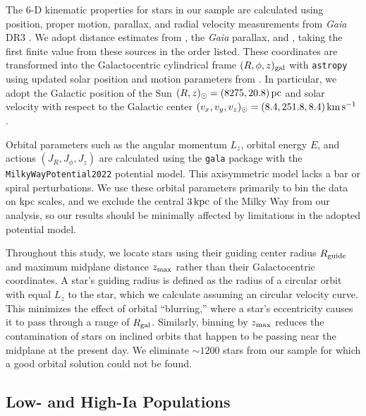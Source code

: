 \documentclass[twocolumn,twocolappendix]{aastex701}
\newcommand{\pc}{\,{\rm pc}}
\newcommand{\kpc}{\,{\rm kpc}}
\newcommand{\kms}{\,{\rm km}\,{\rm s}^{-1}}
\begin{document}
The 6-D kinematic properties for stars in our sample are calculated using position, proper motion, parallax, and radial velocity measurements from {\it Gaia} DR3 \citep{gaia_collaboration_gaia_2023}. We adopt distance estimates from \citet{zhang_parameters_2023}, the {\it Gaia} parallax, and \citet{bailer-jones_estimating_2021}, taking the first finite value from these sources in the order listed. These coordinates are transformed into the Galactocentric cylindrical frame $(R,\phi,z)_{\rm gal}$ with {\tt astropy} \citep{astropy_collaboration_astropy_2013,astropy_collaboration_astropy_2018,astropy_collaboration_astropy_2022} using updated solar position and motion parameters from \citet{hunt_multiple_2022}. In particular, we adopt the Galactic position of the Sun $(R,z)_\odot=(8275,20.8)\pc$ \citep{gravity_collaboration_improved_2021,bennett_vertical_2019} and solar velocity with respect to the Galactic center $(v_x,v_y,v_z)_\odot=(8.4,251.8,8.4)\kms$ \citep{reid_proper_2020,gravity_collaboration_improved_2021}. 

Orbital parameters such as the angular momentum $L_z$, orbital energy $E$, and actions $(J_R,J_\phi,J_z)$ are calculated using the {\tt gala} package \citep{price-whelan_gala_2017} with the {\tt MilkyWayPotential2022} potential model. This axisymmetric model lacks a bar or spiral perturbations. We use these orbital parameters primarily to bin the data on kpc scales, and we exclude the central $3\kpc$ of the Milky Way from our analysis, so our results should be minimally affected by limitations in the adopted potential model.

Throughout this study, we locate stars using their guiding center radius $R_{\rm guide}$ and maximum midplane distance $z_{\rm max}$ rather than their Galactocentric coordinates. A star's guiding radius is defined as the radius of a circular orbit with equal $L_z$ to the star, which we calculate assuming an \citet{eilers_circular_2019} circular velocity curve. This minimizes the effect of orbital ``blurring,'' where a star's eccentricity causes it to pass through a range of $R_{\rm gal}$. Similarly, binning by $z_{\rm max}$ reduces the contamination of stars on inclined orbits that happen to be passing near the midplane at the present day. We eliminate $\sim1200$ stars from our sample for which a good orbital solution could not be found.

\subsection{Low- and High-Ia Populations}
\label{sec:alpha-pops}
\end{document}
